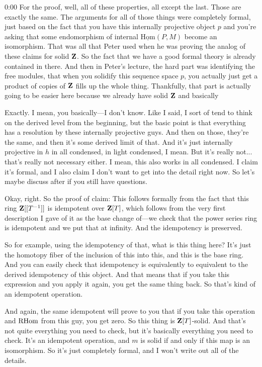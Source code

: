 \begin{unfinished}{0:00}
For the proof, well, all of these properties, all except the last. Those are exactly the same. The arguments for all of those things were completely formal, just based on the fact that you have this internally projective object $p$ and you're asking that some endomorphism of internal $\underline{\text{Hom}}(P,M)$ become an isomorphism. That was all that Peter used when he was proving the analog of these claims for solid $\mathbf Z$. So the fact that we have a good formal theory is already contained in there. And then in Peter's lecture, the hard part was identifying the free modules, that when you solidify this sequence space $p$, you actually just get a product of copies of $\mathbf Z$ fills up the whole thing. Thankfully, that part is actually going to be easier here because we already have solid $\mathbf Z$ and basically

Exactly. I mean, you basically---I don't know. Like I said, I sort of tend to think on the derived level from the beginning, but the basic point is that everything has a resolution by these internally projective guys. And then on those, they're the same, and then it's some derived limit of that. And it's just internally projective in $h$ in all condensed, in light condensed, I mean. But it's really not... that's really not necessary either. I mean, this also works in all condensed. I claim it's formal, and I also claim I don't want to get into the detail right now. So let's maybe discuss after if you still have questions.

Okay, right. So the proof of claim: This follows formally from the fact that this ring $\mathbf Z[[T^{-1}]]$ is idempotent over $\mathbf Z[T]$, which follows from the very first description I gave of it as the base change of---we check that the power series ring is idempotent and we put that at infinity. And the idempotency is preserved.

So for example, using the idempotency of that, what is this thing here? It's just the homotopy fiber of the inclusion of this into this, and this is the base ring. And you can easily check that idempotency is equivalently to equivalent to the derived idempotency of this object. And that means that if you take this expression and you apply it again, you get the same thing back. So that's kind of an idempotent operation.

And again, the same idempotent will prove to you that if you take this operation and $\operatorname{RHom}$ from this guy, you get zero. So this thing is $\mathbf Z[T]$-solid. And that's not quite everything you need to check, but it's basically everything you need to check. It's an idempotent operation, and $m$ is solid if and only if this map is an isomorphism. So it's just completely formal, and I won't write out all of the details.


\end{unfinished}
